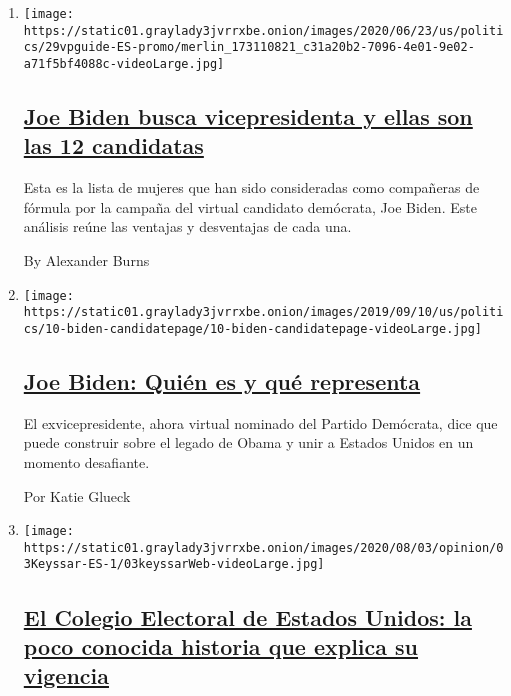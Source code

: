 \begin{enumerate}
\def\labelenumi{\arabic{enumi}.}
\item
  \texttt{[image: https://static01.graylady3jvrrxbe.onion/images/2020/06/23/us/politics/29vpguide-ES-promo/merlin\_173110821\_c31a20b2-7096-4e01-9e02-a71f5bf4088c-videoLarge.jpg]}

  \hypertarget{joe-biden-busca-vicepresidenta-y-ellas-son-las-12-candidatas}{%
  \subsection{\texorpdfstring{\href{/es/2020/07/29/espanol/estados-unidos/biden-vicepresidente.html}{Joe
  Biden busca vicepresidenta y ellas son las 12
  candidatas}}{Joe Biden busca vicepresidenta y ellas son las 12 candidatas}}\label{joe-biden-busca-vicepresidenta-y-ellas-son-las-12-candidatas}}

  Esta es la lista de mujeres que han sido consideradas como compañeras
  de fórmula por la campaña del virtual candidato demócrata, Joe Biden.
  Este análisis reúne las ventajas y desventajas de cada una.

  By Alexander Burns
\item
  \texttt{[image: https://static01.graylady3jvrrxbe.onion/images/2019/09/10/us/politics/10-biden-candidatepage/10-biden-candidatepage-videoLarge.jpg]}

  \hypertarget{joe-biden-quiuxe9n-es-y-quuxe9-representa}{%
  \subsection{\texorpdfstring{\href{/es/interactive/2020/espanol/estados-unidos/joe-biden-elecciones.html}{Joe
  Biden: Quién es y qué
  representa}}{Joe Biden: Quién es y qué representa}}\label{joe-biden-quiuxe9n-es-y-quuxe9-representa}}

  El exvicepresidente, ahora virtual nominado del Partido Demócrata,
  dice que puede construir sobre el legado de Obama y unir a Estados
  Unidos en un momento desafiante.

  Por Katie Glueck
\item
  \texttt{[image: https://static01.graylady3jvrrxbe.onion/images/2020/08/03/opinion/03Keyssar-ES-1/03keyssarWeb-videoLarge.jpg]}

  \hypertarget{el-colegio-electoral-de-estados-unidos-la-poco-conocida-historia-que-explica-su-vigencia}{%
  \subsection{\texorpdfstring{\href{/es/2020/08/03/espanol/opinion/colegio-electoral-estados-unidos.html}{El
  Colegio Electoral de Estados Unidos: la poco conocida historia que
  explica su
  vigencia}}{El Colegio Electoral de Estados Unidos: la poco conocida historia que explica su vigencia}}\label{el-colegio-electoral-de-estados-unidos-la-poco-conocida-historia-que-explica-su-vigencia}}


\end{enumerate}
